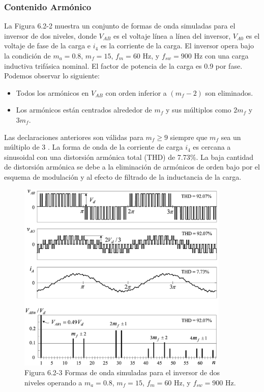 \documentclass[letterpaper,12pt]{article}
\begin{document}
\subsubsection{Contenido Armónico}
La Figura 6.2-2 muestra un conjunto de formas de onda simuladas para el inversor de dos niveles, donde $V_{AB}$ es el voltaje línea a línea del inversor, $V_{A0}$ es el voltaje de fase de la carga e $i_4$ es la corriente de la carga. El inversor opera bajo la condición de $m_a = 0.8$, $m_f = 15$, $f_m = 60$ Hz, y $f_{sw} = 900$ Hz con una carga inductiva trifásica nominal. El factor de potencia de la carga es 0.9 por fase. Podemos observar lo siguiente:

\begin{itemize}
	\item Todos los armónicos en $V_{AB}$ con orden inferior a $(m_f - 2)$ son eliminados.
	\item Los armónicos están centrados alrededor de $m_f$ y sus múltiplos como $2m_f$ y $3m_f$.
\end{itemize}

Las declaraciones anteriores son válidas para $m_f \geq 9$ siempre que $m_f$ sea un múltiplo de 3 \cite{ref1}. La forma de onda de la corriente de carga $i_4$ es cercana a sinusoidal con una distorsión armónica total (THD) de 7.73\%. La baja cantidad de distorsión armónica se debe a la eliminación de armónicos de orden bajo por el esquema de modulación y al efecto de filtrado de la inductancia de la carga.

\begin{figure}[h]
	\centering
	\includegraphics[width=0.9\textwidth]{graficos/img71.jpg}
	\caption{Figura 6.2-3 Formas de onda simuladas para el inversor de dos niveles operando a $m_a = 0.8$, $m_f = 15$, $f_m = 60$ Hz, y $f_{sw} = 900$ Hz.}
\end{figure}
\FloatBarrier
\end{document}
